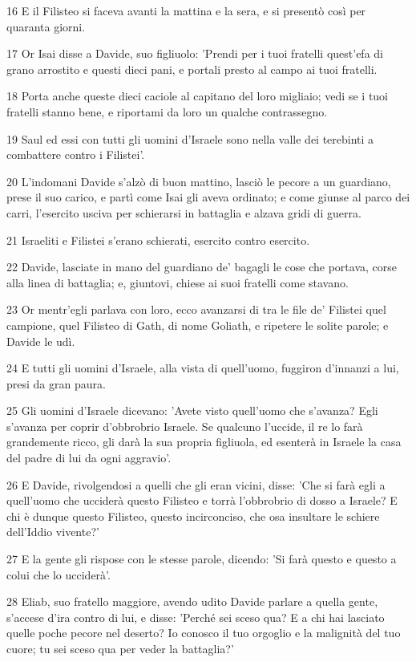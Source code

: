 \par 16 E il Filisteo si faceva avanti la mattina e la sera, e si presentò così per quaranta giorni.
\par 17 Or Isai disse a Davide, suo figliuolo: 'Prendi per i tuoi fratelli quest'efa di grano arrostito e questi dieci pani, e portali presto al campo ai tuoi fratelli.
\par 18 Porta anche queste dieci caciole al capitano del loro migliaio; vedi se i tuoi fratelli stanno bene, e riportami da loro un qualche contrassegno.
\par 19 Saul ed essi con tutti gli uomini d'Israele sono nella valle dei terebinti a combattere contro i Filistei'.
\par 20 L'indomani Davide s'alzò di buon mattino, lasciò le pecore a un guardiano, prese il suo carico, e partì come Isai gli aveva ordinato; e come giunse al parco dei carri, l'esercito usciva per schierarsi in battaglia e alzava gridi di guerra.
\par 21 Israeliti e Filistei s'erano schierati, esercito contro esercito.
\par 22 Davide, lasciate in mano del guardiano de' bagagli le cose che portava, corse alla linea di battaglia; e, giuntovi, chiese ai suoi fratelli come stavano.
\par 23 Or mentr'egli parlava con loro, ecco avanzarsi di tra le file de' Filistei quel campione, quel Filisteo di Gath, di nome Goliath, e ripetere le solite parole; e Davide le udì.
\par 24 E tutti gli uomini d'Israele, alla vista di quell'uomo, fuggiron d'innanzi a lui, presi da gran paura.
\par 25 Gli uomini d'Israele dicevano: 'Avete visto quell'uomo che s'avanza? Egli s'avanza per coprir d'obbrobrio Israele. Se qualcuno l'uccide, il re lo farà grandemente ricco, gli darà la sua propria figliuola, ed esenterà in Israele la casa del padre di lui da ogni aggravio'.
\par 26 E Davide, rivolgendosi a quelli che gli eran vicini, disse: 'Che si farà egli a quell'uomo che ucciderà questo Filisteo e torrà l'obbrobrio di dosso a Israele? E chi è dunque questo Filisteo, questo incirconciso, che osa insultare le schiere dell'Iddio vivente?'
\par 27 E la gente gli rispose con le stesse parole, dicendo: 'Si farà questo e questo a colui che lo ucciderà'.
\par 28 Eliab, suo fratello maggiore, avendo udito Davide parlare a quella gente, s'accese d'ira contro di lui, e disse: 'Perché sei sceso qua? E a chi hai lasciato quelle poche pecore nel deserto? Io conosco il tuo orgoglio e la malignità del tuo cuore; tu sei sceso qua per veder la battaglia?'
